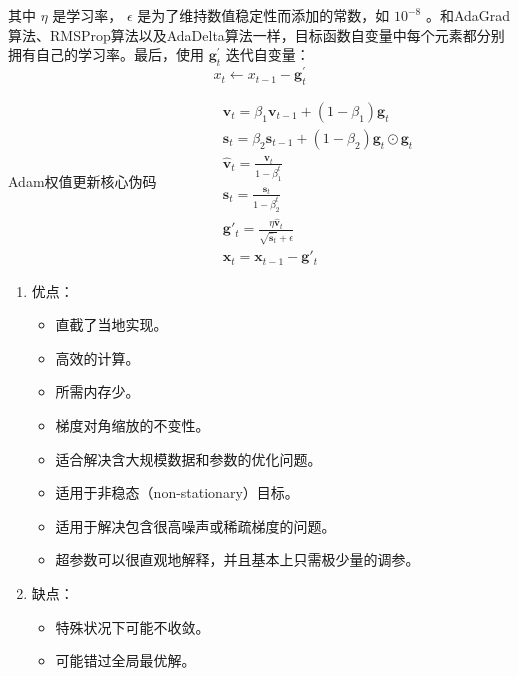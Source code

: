 \documentclass[UTF-8]{progbookcn}
\begin{document}
其中 $\eta$ 是学习率， $\epsilon$ 是为了维持数值稳定性而添加的常数，如 $10^{−8}$ 。和AdaGrad算法、RMSProp算法以及AdaDelta算法一样，目标函数自变量中每个元素都分别拥有自己的学习率。最后，使用 $\bm{g}^′_t$ 迭代自变量：
\begin{equation}\label{E:Adam6}
  x_t←x_{t−1}−\bm{g}^′_t
\end{equation}


\begin{titledbox}{Adam权值更新核心伪码}
$\begin{array}{l}
   \qquad\qquad\bm{v}_t=\beta_1\bm{v}_{t-1}+(1-\beta_1)\bm{g}_t\\
   \qquad\qquad\bm{s}_t = \beta_2\bm{s}_{t-1}+(1-\beta_2)\bm{g}_t\odot \bm{g}_t \\
   \qquad\qquad\bm{\hat{v}}_t=\frac{\bm{v}_t}{1-\beta^t_1}\\
   \qquad\qquad\bm{\hat{s}}_t=\frac{\bm{s}_t}{1-\beta^t_2}\\
   \qquad\qquad\bm{g}'_t=\frac{\eta \bm{\hat{v}}_t}{\sqrt{\bm{\hat{s}}_t}+\epsilon}\\
   \qquad\qquad\bm{x}_t = \bm{x}_{t-1}- \bm{g}'_t\end{array}$
\end{titledbox}


\begin{enumerate}
  \item 优点：
    \begin{itemize}
      \item 直截了当地实现。
        \item 高效的计算。
        \item 所需内存少。
        \item 梯度对角缩放的不变性。
        \item 适合解决含大规模数据和参数的优化问题。
        \item 适用于非稳态（non-stationary）目标。
        \item 适用于解决包含很高噪声或稀疏梯度的问题。
        \item 超参数可以很直观地解释，并且基本上只需极少量的调参。

    \end{itemize}
  \item 缺点：
  \begin{itemize}
    \item 特殊状况下可能不收敛。
    \item 可能错过全局最优解。
  \end{itemize}
\end{enumerate}
\end{document}
